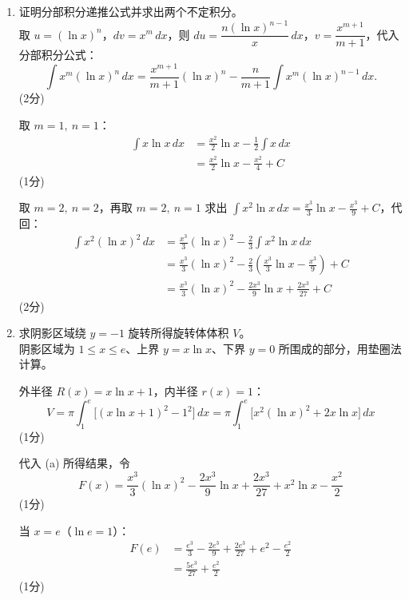 \documentclass[12pt,a4paper]{exam-zh}
\begin{document}
\begin{solution}
    \begin{enumerate}[label=(\alph*)]
        \item 证明分部积分递推公式并求出两个不定积分。 \\
        取 $u=(\ln x)^n$，$dv=x^m\,dx$，则 $du=\dfrac{n(\ln x)^{n-1}}{x}\,dx$，$v=\dfrac{x^{m+1}}{m+1}$，代入分部积分公式：
        \[
            \int x^m(\ln x)^n\,dx=\frac{x^{m+1}}{m+1}(\ln x)^n-\frac{n}{m+1}\int x^m(\ln x)^{n-1}\,dx.
        \]
        \hfill (2分)

        取 $m=1,\ n=1$：
        \begin{align*}
            \int x\ln x\,dx &=\frac{x^2}{2}\ln x-\frac{1}{2}\int x\,dx \\
            &=\frac{x^2}{2}\ln x-\frac{x^2}{4}+C
        \end{align*}
        \hfill (1分)

        取 $m=2,\ n=2$，再取 $m=2,\ n=1$ 求出 $\displaystyle\int x^2\ln x\,dx=\frac{x^3}{3}\ln x-\frac{x^3}{9}+C$，代回：
        \begin{align*}
            \int x^2(\ln x)^2\,dx &=\frac{x^3}{3}(\ln x)^2-\frac{2}{3}\int x^2\ln x\,dx \\
            &=\frac{x^3}{3}(\ln x)^2-\frac{2}{3}\left(\frac{x^3}{3}\ln x-\frac{x^3}{9}\right)+C \\
            &=\frac{x^3}{3}(\ln x)^2-\frac{2x^3}{9}\ln x+\frac{2x^3}{27}+C
        \end{align*}
        \hfill (2分)

        \item 求阴影区域绕 $y=-1$ 旋转所得旋转体体积 $V$。 \\
        阴影区域为 $1\le x\le e$、上界 $y=x\ln x$、下界 $y=0$ 所围成的部分，用垫圈法计算。

        外半径 $R(x)=x\ln x+1$，内半径 $r(x)=1$：
        \[
            V=\pi\int_1^e\Big[(x\ln x+1)^2-1^2\Big]\,dx=\pi\int_1^e\Big[x^2(\ln x)^2+2x\ln x\Big]\,dx
        \]
        \hfill (1分)

        代入 (a) 所得结果，令
        \[
            F(x)=\frac{x^3}{3}(\ln x)^2-\frac{2x^3}{9}\ln x+\frac{2x^3}{27}+x^2\ln x-\frac{x^2}{2}
        \]
        \hfill (1分)

        当 $x=e$（$\ln e=1$）：
        \begin{align*}
            F(e) &=\frac{e^3}{3}-\frac{2e^3}{9}+\frac{2e^3}{27}+e^2-\frac{e^2}{2} \\
            &=\frac{5e^3}{27}+\frac{e^2}{2}
        \end{align*}
        \hfill (1分)


\end{enumerate}
\end{solution}
\end{document}
